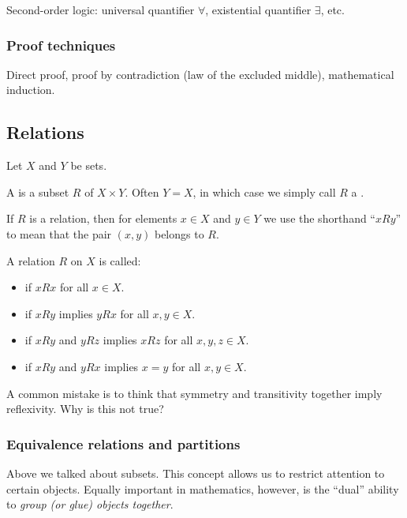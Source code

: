 Second-order logic: universal quantifier $\forall$, existential quantifier $\exists$, etc.

\subsubsection*{Proof techniques}

Direct proof, proof by contradiction (law of the excluded middle), mathematical induction.

\subsection{Relations}

Let $X$ and $Y$ be sets.

\begin{definition}
A  is a subset $R$ of $X \times Y$. Often $Y=X$, in which case we simply call $R$ a .
\end{definition}

If $R$ is a relation, then for elements $x \in X$ and $y \in Y$ we use the shorthand ``$xRy$'' to mean that the pair $(x,y)$ belongs to $R$.

\begin{definition}
A relation $R$ on $X$ is called:
\begin{itemize}
\item {} if $xRx$ for all $x \in X$.
\item {} if $xRy$ implies $yRx$ for all $x,y \in X$.
\item {} if $xRy$ and $yRz$ implies $xRz$ for all $x,y,z \in X$.
\item {} if $xRy$ and $yRx$ implies $x=y$ for all $x,y \in X$.
\end{itemize}
\end{definition}

\begin{exercise}
A common mistake is to think that symmetry and transitivity together imply reflexivity. Why is this not true?
\end{exercise}

\subsubsection{Equivalence relations and partitions}

Above we talked about subsets. This concept allows us to restrict attention to certain objects. Equally important in mathematics, however, is the ``dual'' ability to \emph{group (or glue) objects together}.

